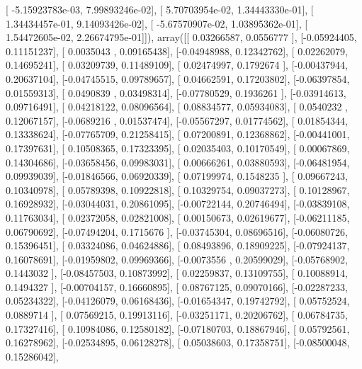 \documentclass{article}
\begin{document}
       [ -5.15923783e-03,   7.99893246e-02],
       [  5.70703954e-02,   1.34443330e-01],
       [  1.34434457e-01,   9.14093426e-02],
       [ -5.67570907e-02,   1.03895362e-01],
       [  1.54472605e-02,   2.26674795e-01]]), array([[ 0.03266587,  0.0556777 ],
       [-0.05924405,  0.11151237],
       [ 0.0035043 ,  0.09165438],
       [-0.04948988,  0.12342762],
       [ 0.02262079,  0.14695241],
       [ 0.03209739,  0.11489109],
       [ 0.02474997,  0.1792674 ],
       [-0.00437944,  0.20637104],
       [-0.04745515,  0.09789657],
       [ 0.04662591,  0.17203802],
       [-0.06397854,  0.01559313],
       [ 0.0490839 ,  0.03498314],
       [-0.07780529,  0.1936261 ],
       [-0.03914613,  0.09716491],
       [ 0.04218122,  0.08096564],
       [ 0.08834577,  0.05934083],
       [ 0.0540232 ,  0.12067157],
       [-0.0689216 ,  0.01537474],
       [-0.05567297,  0.01774562],
       [ 0.01854344,  0.13338624],
       [-0.07765709,  0.21258415],
       [ 0.07200891,  0.12368862],
       [-0.00441001,  0.17397631],
       [ 0.10508365,  0.17323395],
       [ 0.02035403,  0.10170549],
       [ 0.00067869,  0.14304686],
       [-0.03658456,  0.09983031],
       [ 0.00666261,  0.03880593],
       [-0.06481954,  0.09939039],
       [-0.01846566,  0.06920339],
       [ 0.07199974,  0.1548235 ],
       [ 0.09667243,  0.10340978],
       [ 0.05789398,  0.10922818],
       [ 0.10329754,  0.09037273],
       [ 0.10128967,  0.16928932],
       [-0.03044031,  0.20861095],
       [-0.00722144,  0.20746494],
       [-0.03839108,  0.11763034],
       [ 0.02372058,  0.02821008],
       [ 0.00150673,  0.02619677],
       [-0.06211185,  0.06790692],
       [-0.07494204,  0.1715676 ],
       [-0.03745304,  0.08696516],
       [-0.06080726,  0.15396451],
       [ 0.03324086,  0.04624886],
       [ 0.08493896,  0.18909225],
       [-0.07924137,  0.16078691],
       [-0.01959802,  0.09969366],
       [-0.0073556 ,  0.20599029],
       [-0.05768902,  0.1443032 ],
       [-0.08457503,  0.10873992],
       [ 0.02259837,  0.13109755],
       [ 0.10088914,  0.1494327 ],
       [-0.00704157,  0.16660895],
       [ 0.08767125,  0.09070166],
       [-0.02287233,  0.05234322],
       [-0.04126079,  0.06168436],
       [-0.01654347,  0.19742792],
       [ 0.05752524,  0.0889714 ],
       [ 0.07569215,  0.19913116],
       [-0.03251171,  0.20206762],
       [ 0.06784735,  0.17327416],
       [ 0.10984086,  0.12580182],
       [-0.07180703,  0.18867946],
       [ 0.05792561,  0.16278962],
       [-0.02534895,  0.06128278],
       [ 0.05038603,  0.17358751],
       [-0.08500048,  0.15286042],
\end{document}
